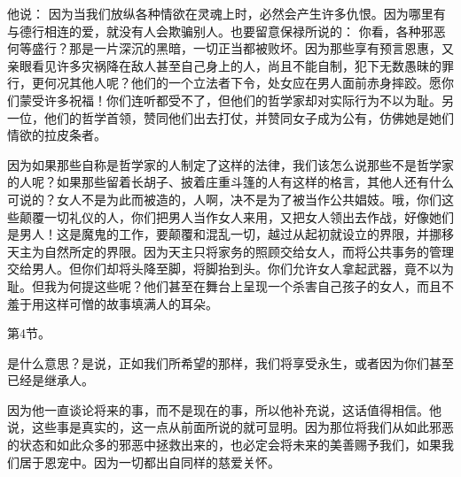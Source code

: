 他说：  因为当我们放纵各种情欲在灵魂上时，必然会产生许多仇恨。因为哪里有与德行相连的爱，就没有人会欺骗别人。也要留意保禄所说的：  你看，各种邪恶何等盛行？那是一片深沉的黑暗，一切正当都被败坏。因为那些享有预言恩惠，又亲眼看见许多灾祸降在敌人甚至自己身上的人，尚且不能自制，犯下无数愚昧的罪行，更何况其他人呢？他们的一个立法者下令，处女应在男人面前赤身摔跤。愿你们蒙受许多祝福！你们连听都受不了，但他们的哲学家却对实际行为不以为耻。另一位，他们的哲学首领，赞同他们出去打仗，并赞同女子成为公有，仿佛她是她们情欲的拉皮条者。\par

\par

因为如果那些自称是哲学家的人制定了这样的法律，我们该怎么说那些不是哲学家的人呢？如果那些留着长胡子、披着庄重斗篷的人有这样的格言，其他人还有什么可说的？女人不是为此而被造的，人啊，决不是为了被当作公共娼妓。哦，你们这些颠覆一切礼仪的人，你们把男人当作女人来用，又把女人领出去作战，好像她们是男人！这是魔鬼的工作，要颠覆和混乱一切，越过从起初就设立的界限，并挪移天主为自然所定的界限。因为天主只将家务的照顾交给女人，而将公共事务的管理交给男人。但你们却将头降至脚，将脚抬到头。你们允许女人拿起武器，竟不以为耻。但我为何提这些呢？他们甚至在舞台上呈现一个杀害自己孩子的女人，而且不羞于用这样可憎的故事填满人的耳朵。\par

第4节。 \par

是什么意思？是说，正如我们所希望的那样，我们将享受永生，或者因为你们甚至已经是继承人。\par

\par

因为他一直谈论将来的事，而不是现在的事，所以他补充说，这话值得相信。他说，这些事是真实的，这一点从前面所说的就可显明。因为那位将我们从如此邪恶的状态和如此众多的邪恶中拯救出来的，也必定会将未来的美善赐予我们，如果我们居于恩宠中。因为一切都出自同样的慈爱关怀。\par

